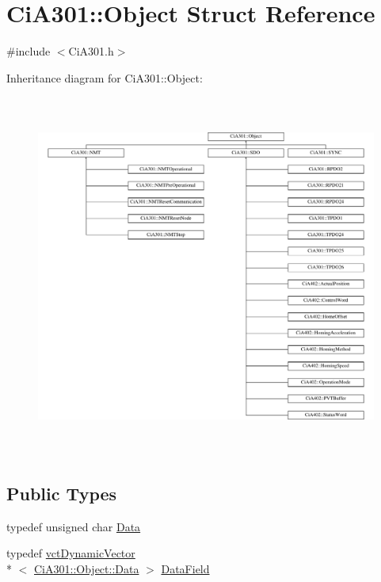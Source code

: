 \hypertarget{struct_ci_a301_1_1_object}{\section{Ci\-A301\-:\-:Object Struct Reference}
\label{struct_ci_a301_1_1_object}
}


{\ttfamily \#include $<$Ci\-A301.\-h$>$}

Inheritance diagram for Ci\-A301\-:\-:Object\-:\begin{figure}[H]
\begin{center}
\leavevmode
\includegraphics[height=11.943128cm]{da/d3b/struct_ci_a301_1_1_object}
\end{center}
\end{figure}
\subsection*{Public Types}
\begin{DoxyCompactItemize}
\item 
typedef unsigned char \hyperlink{struct_ci_a301_1_1_object_a9fd091097bb03da4a28a403485c3a10f}{Data}
\item 
typedef \hyperlink{classvct_dynamic_vector}{vct\-Dynamic\-Vector}\\*
$<$ \hyperlink{struct_ci_a301_1_1_object_a9fd091097bb03da4a28a403485c3a10f}{Ci\-A301\-::\-Object\-::\-Data} $>$ \hyperlink{struct_ci_a301_1_1_object_a2344da0462f8dd535bbf311be83d435a}{Data\-Field}
\end{DoxyCompactItemize}
